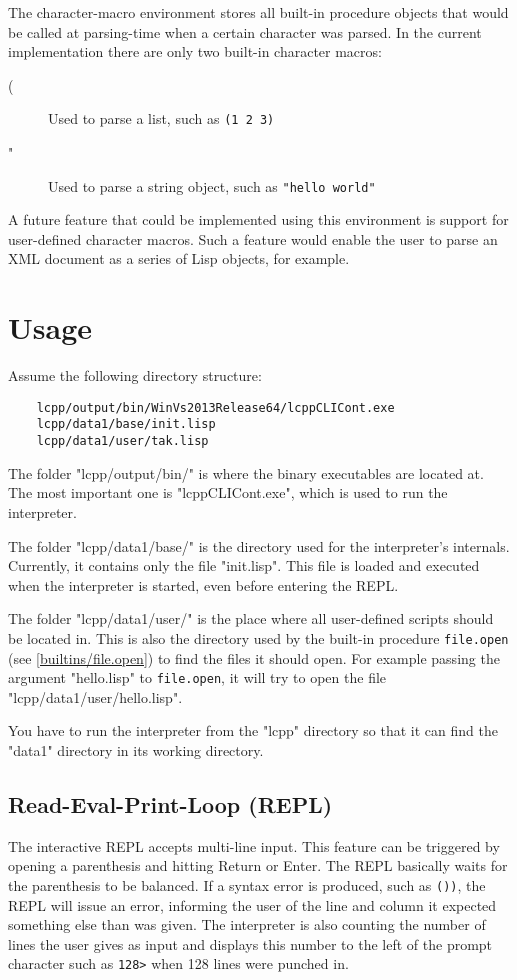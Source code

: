 \documentclass[a4paper]{scrartcl}
\newcommand{\lisp}{Lisp}
\begin{document}
	The character-macro environment stores all built-in procedure objects that would be called at parsing-time when a certain character was parsed. In the current implementation there are only two built-in character macros:
	\begin{description}
		\item[(] Used to parse a list, such as \lstinline|(1 2 3)|
		\item["] Used to parse a string object, such as \lstinline|"hello world"|
	\end{description}

	A future feature that could be implemented using this environment is support for user-defined character macros. Such a feature would enable the user to parse an XML document as a series of \lisp{} objects, for example.

\section{Usage}
\label{usage}
	Assume the following directory structure:
	\begin{lstlisting}
	lcpp/output/bin/WinVs2013Release64/lcppCLICont.exe
	lcpp/data1/base/init.lisp
	lcpp/data1/user/tak.lisp
	\end{lstlisting}

	The folder "lcpp/output/bin/" is where the binary executables are located at. The most important one is "lcppCLICont.exe", which is used to run the interpreter.

	The folder "lcpp/data1/base/" is the directory used for the interpreter's internals. Currently, it contains only the file "init.lisp". This file is loaded and executed when the interpreter is started, even before entering the REPL.

	The folder "lcpp/data1/user/" is the place where all user-defined scripts should be located in. This is also the directory used by the built-in procedure \lstinline|file.open| (see \ref{builtins/file.open}) to find the files it should open. For example passing the argument "hello.lisp" to \lstinline|file.open|, it will try to open the file "lcpp/data1/user/hello.lisp".

	You have to run the interpreter from the "lcpp" directory so that it can find the "data1" directory in its working directory.

\subsection{Read-Eval-Print-Loop (REPL)}
\label{usage/repl}
	The interactive REPL accepts multi-line input. This feature can be triggered by opening a parenthesis and hitting Return or Enter. The REPL basically waits for the parenthesis to be balanced. If a syntax error is produced, such as \lstinline|())|, the REPL will issue an error, informing the user of the line and column it expected something else than was given. The interpreter is also counting the number of lines the user gives as input and displays this number to the left of the prompt character such as \lstinline|128>| when 128 lines were punched in.
\end{document}
